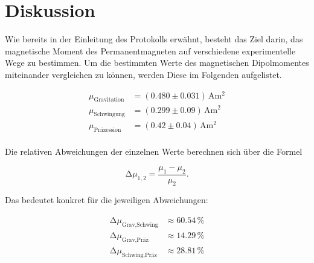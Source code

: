 %

%
\section{Diskussion}
\label{sec:Diskussion}

Wie bereits in der Einleitung des Protokolls erwähnt, besteht das Ziel darin, das magnetische Moment des Permanentmagneten
auf verschiedene experimentelle Wege zu bestimmen. Um die bestimmten Werte des magnetischen Dipolmomentes miteinander 
vergleichen zu können, werden Diese im Folgenden aufgelistet.

\begin{align*}
    \mu_\text{Gravitation} &= \left(0.480 \pm 0.031\right)\,\unit{\ampere\meter\squared} \\
    \mu_\text{Schwingung} &= \left(0.299 \pm 0.09\right)\,\unit{\ampere\meter\squared} \\
    \mu_\text{Präzession} &= \left(0.42 \pm 0.04\right)\,\unit{\ampere\meter\squared} \\
\end{align*}

\noindent Die relativen Abweichungen der einzelnen Werte berechnen sich über die Formel 

\begin{equation*}
    \increment\mu_{1,2} = \frac{\mu_1 - \mu_2}{\mu_2}.
\end{equation*}

\noindent Das bedeutet konkret für die jeweiligen Abweichungen:

\begin{align*}
    \increment\mu_\text{Grav,Schwing} &\approx 60.54\,\unit{\percent} \\
    \increment\mu_\text{Grav,Präz} &\approx 14.29\,\unit{\percent} \\
    \increment\mu_\text{Schwing,Präz} &\approx 28.81\,\unit{\percent} \\
\end{align*}


